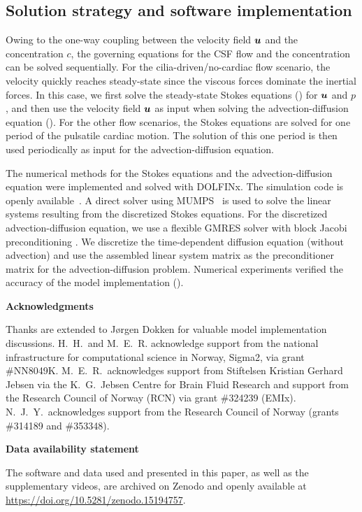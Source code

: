 \documentclass{WileyMSP-template}
\begin{document}
\subsection{Solution strategy and software implementation}
Owing to the one-way coupling between the velocity field $\bm{u}$
and the concentration $c$, the governing equations for the
CSF flow and the concentration can be solved sequentially.
For the cilia-driven/no-cardiac flow scenario, the velocity quickly reaches steady-state since
the viscous forces dominate the inertial forces.
In this case, we first solve the steady-state Stokes equations ()
for $\bm{u}$ and $p$, and then use the velocity field $\bm{u}$ as input when solving
the advection-diffusion equation ().
For the other flow scenarios, the Stokes equations are solved for one
period of the pulsatile cardiac motion. The solution of this one period
is then used periodically as input for the advection-diffusion equation.

The numerical methods for the Stokes equations and the
advection-diffusion equation were implemented and solved
with DOLFINx\cite{dolfinx2023preprint}.
The simulation code is openly
available~\cite{Herlyng2025Zenodo}.
A direct solver using MUMPS~\cite{Amestoy2011Mumps} is used to solve the
linear systems resulting from the discretized Stokes equations.
For the discretized advection-diffusion equation, we use a flexible GMRES solver
with block Jacobi preconditioning \cite{fgmres, Jacobi1845UeberGleichungen}. 
We discretize the time-dependent diffusion equation (without advection)
and use the assembled linear system matrix
as the preconditioner matrix for the advection-diffusion problem.
Numerical experiments verified the accuracy of the model implementation
(). 

\medskip
\noindent \textbf{Acknowledgments} \par
\noindent Thanks are extended to J\o rgen Dokken
for valuable model implementation discussions.  H.~H.~and
M.~E.~R. acknowledge support from the national infrastructure for
computational science in Norway, Sigma2, via grant
\#NN8049K. M.~E.~R.~acknowledges support from Stiftelsen Kristian
Gerhard Jebsen via the K.~G.~Jebsen Centre for Brain Fluid Research
and support from the Research Council of Norway (RCN) via grant
\#324239 (EMIx). N.~J.~Y.~acknowledges support from the Research
Council of Norway (grants \#314189 and \#353348).

\medskip
\noindent \textbf{Data availability statement} \par
\noindent The software and data used and presented in this paper,
as well as the supplementary videos, are
archived on Zenodo and openly available at
\href{https://doi.org/10.5281/zenodo.15194757}{https://doi.org/10.5281/zenodo.15194757}\cite{Herlyng2025Zenodo}.
\end{document}
